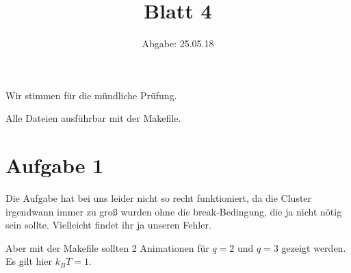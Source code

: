 

\usepackage{listings}
\usepackage[dvipsnames]{xcolor}

\title{Blatt 4}
\date{
  Abgabe: 25.05.18
}


\maketitle
Wir stimmen für die mündliche Prüfung.

Alle Dateien ausführbar mit der Makefile. %
\section*{Aufgabe 1}
Die Aufgabe hat bei uns leider nicht so recht funktioniert, da die Cluster irgendwann immer zu groß wurden ohne die break-Bedingung, die ja nicht nötig sein sollte. Vielleicht findet ihr ja unseren Fehler.

Aber mit der Makefile sollten 2 Animationen für $q=2$ und $q=3$ gezeigt werden.
Es gilt hier $k_BT =1$.






